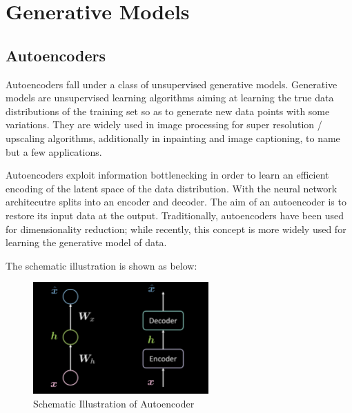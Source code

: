 \chapter{Generative Models}
\section{ Autoencoders }

Autoencoders fall under a class of unsupervised generative models. Generative models are unsupervised learning algorithms aiming at learning the true data distributions of the training set so as to generate new data points with some variations. They are widely used in image processing for super resolution / upscaling algorithms, additionally in inpainting and image captioning, to name but a few applications.

Autoencoders exploit information bottlenecking in order to learn an efficient encoding of the latent space of the data distribution. With the neural network architecutre splits into an encoder and decoder. The aim of an autoencoder is to restore its input data at the output. Traditionally, autoencoders have been used for dimensionality reduction; while recently, this concept is more widely used for learning the generative model of data.

The schematic illustration is shown as below:

\begin{figure}[htb]
    \centering
    \includegraphics[width=0.6\textwidth]{figs/Schematic_Illustration_of_Autoencoder.png}
    \caption{Schematic Illustration of Autoencoder}
    \label{fig:Schematic_Illustration_of_Autoencoder}
\end{figure}

